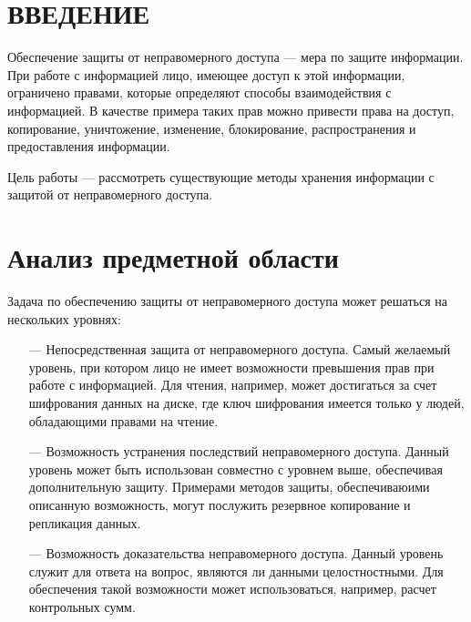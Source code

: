 


\normalsize
\setcounter{page}{3}

\pagebreak

\tableofcontents
\normalsize

\pagebreak

\section*{ВВЕДЕНИЕ}

Обеспечение защиты от неправомерного доступа --- мера по защите информации. При работе с информацией лицо, имеющее доступ к этой информации, ограничено правами, которые определяют способы взаимодействия с информацией. В качестве примера таких прав можно привести права на доступ, копирование, уничтожение, изменение, блокирование, распространения и предоставления информации.

Цель работы --- рассмотреть существующие методы хранения информации с защитой от неправомерного доступа.

\pagebreak

\section{Анализ предметной области}

Задача по обеспечению защиты от неправомерного доступа может решаться на нескольких уровнях:
\begin{itemize}
    \item[---] Непосредственная защита от неправомерного доступа. Самый желаемый уровень, при котором лицо не имеет возможности превышения прав при работе с информацией. Для чтения, например, может достигаться за счет шифрования данных на диске, где ключ шифрования имеется только у людей, обладающими правами на чтение.
    \item[---] Возможность устранения последствий неправомерного доступа. Данный уровень может быть использован совместно с уровнем выше, обеспечивая дополнительную защиту. Примерами методов защиты, обеспечиваюими описанную возможность, могут послужить резервное копирование и репликация данных.
    \item[---] Возможность доказательства неправомерного доступа. Данный уровень служит для ответа на вопрос, являются ли данными целостностными. Для обеспечения такой возможности может использоваться, например, расчет контрольных сумм.
\end{itemize}

